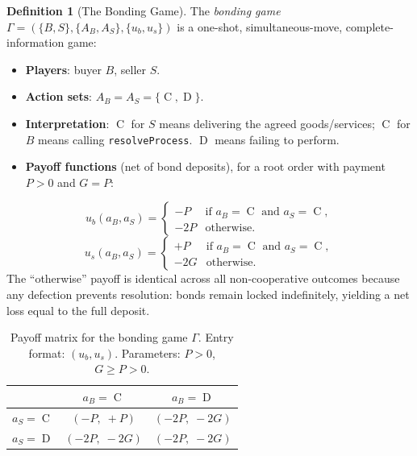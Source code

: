 \documentclass[11pt,a4paper]{article}
\theoremstyle{definition}
\newtheorem{definition}[theorem]{Definition}
\theoremstyle{remark}
\newcommand{\pay}{P}           %
\newcommand{\cumval}{G}        %
\newcommand{\ub}{u_b}          %
\newcommand{\us}{u_s}          %
\DeclareMathOperator{\Coop}{C}
\DeclareMathOperator{\Def}{D}
\begin{document}
\begin{definition}[The Bonding Game]
\label{def:bonding-game}
The \emph{bonding game} $\Gamma = (\{B, S\}, \{A_B, A_S\}, \{\ub, \us\})$
is a one-shot, simultaneous-move, complete-information game:
\begin{itemize}
  \item \textbf{Players}: buyer $B$, seller $S$.
  \item \textbf{Action sets}: $A_B = A_S = \{\Coop, \Def\}$.
  \item \textbf{Interpretation}: $\Coop$ for $S$ means delivering the
    agreed goods/services; $\Coop$ for $B$ means calling
    \texttt{resolveProcess}. $\Def$ means failing to perform.
  \item \textbf{Payoff functions} (net of bond deposits), for a root
    order with payment $\pay > 0$ and $\cumval = \pay$:
\end{itemize}
\begin{equation}\label{eq:utility-buyer}
  \ub(a_B, a_S) =
  \begin{cases}
    -\pay & \text{if } a_B = \Coop \text{ and } a_S = \Coop, \\
    -2\pay & \text{otherwise}.
  \end{cases}
\end{equation}
\begin{equation}\label{eq:utility-seller}
  \us(a_B, a_S) =
  \begin{cases}
    +\pay & \text{if } a_B = \Coop \text{ and } a_S = \Coop, \\
    -2\cumval & \text{otherwise}.
  \end{cases}
\end{equation}
The ``otherwise'' payoff is identical across all non-cooperative
outcomes because any defection prevents resolution: bonds remain
locked indefinitely, yielding a net loss equal to the full deposit.
\end{definition}

\begin{table}[ht]
\centering
\caption{Payoff matrix for the bonding game $\Gamma$.
Entry format: $(\ub, \us)$. Parameters: $\pay > 0$,
$\cumval \geq \pay > 0$.}
\label{tab:payoff-matrix}
\begin{tabular}{lcc}
\toprule
 & $a_B = \Coop$ & $a_B = \Def$ \\
\midrule
$a_S = \Coop$ & $(-\pay,\; +\pay)$ & $(-2\pay,\; -2\cumval)$ \\
$a_S = \Def$  & $(-2\pay,\; -2\cumval)$ & $(-2\pay,\; -2\cumval)$ \\
\bottomrule
\end{tabular}
\end{table}
\end{document}
